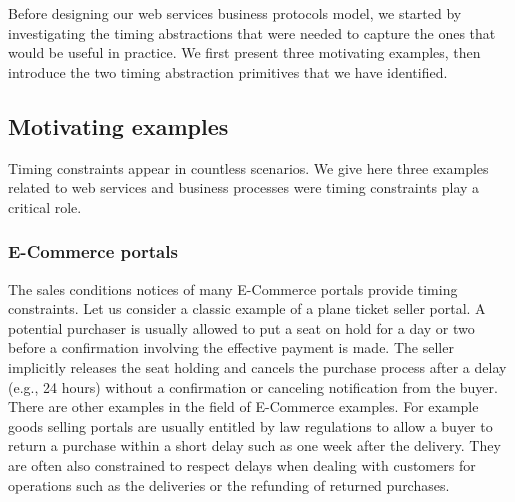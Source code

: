 Before designing our web services business protocols model, we started by investigating the timing abstractions that were needed to capture the ones that would be useful in practice. We first present three motivating examples, then introduce the two timing abstraction primitives that we have identified.


\subsection{Motivating examples}

Timing constraints appear in countless scenarios. We give here three examples related to web services and business processes were timing constraints play a critical role.


\subsubsection{E-Commerce portals}

The sales conditions notices of many E-Commerce portals provide timing constraints. Let us consider a classic example of a plane ticket seller portal. A potential purchaser is usually allowed to put a seat on hold for a day or two before a confirmation involving the effective payment is made. The seller implicitly releases the seat holding and cancels the purchase process after a delay (e.g., 24 hours) without a confirmation or canceling notification from the buyer. There are other examples in the field of E-Commerce examples. For example goods selling portals are usually entitled by law regulations to allow a buyer to return a purchase within a short delay such as one week after the delivery. They are often also constrained to respect delays when dealing with customers for operations such as the deliveries or the refunding of returned purchases.

